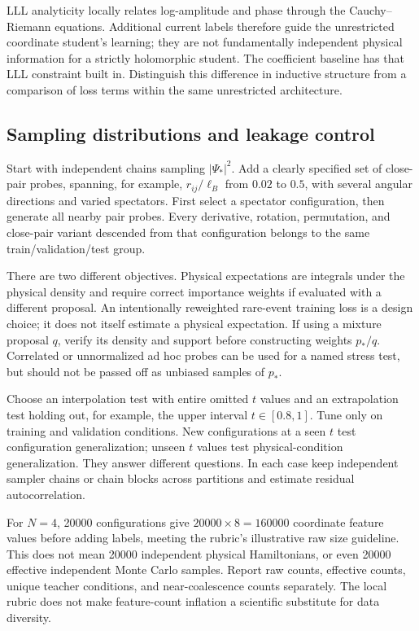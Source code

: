 \documentclass[11pt,letterpaper]{article}
\begin{document}
LLL analyticity locally relates log-amplitude and phase through the Cauchy--Riemann equations. Additional current labels therefore guide the unrestricted coordinate student's learning; they are not fundamentally independent physical information for a strictly holomorphic student. The coefficient baseline has that LLL constraint built in. Distinguish this difference in inductive structure from a comparison of loss terms within the same unrestricted architecture.

\subsection{Sampling distributions and leakage control}

Start with independent chains sampling $|\Psi_*|^2$. Add a clearly specified set of close-pair probes, spanning, for example, $r_{ij}/\ell_B$ from $0.02$ to $0.5$, with several angular directions and varied spectators. First select a spectator configuration, then generate all nearby pair probes. Every derivative, rotation, permutation, and close-pair variant descended from that configuration belongs to the same train/validation/test group.

There are two different objectives. Physical expectations are integrals under the physical density and require correct importance weights if evaluated with a different proposal. An intentionally reweighted rare-event training loss is a design choice; it does not itself estimate a physical expectation. If using a mixture proposal $q$, verify its density and support before constructing weights $p_*/q$. Correlated or unnormalized ad hoc probes can be used for a named stress test, but should not be passed off as unbiased samples of $p_*$.

Choose an interpolation test with entire omitted $t$ values and an extrapolation test holding out, for example, the upper interval $t\in[0.8,1]$. Tune only on training and validation conditions. New configurations at a seen $t$ test configuration generalization; unseen $t$ values test physical-condition generalization. They answer different questions. In each case keep independent sampler chains or chain blocks across partitions and estimate residual autocorrelation.

For $N=4$, 20000 configurations give $20000\times8=160000$ coordinate feature values before adding labels, meeting the rubric's illustrative raw size guideline. This does not mean 20000 independent physical Hamiltonians, or even 20000 effective independent Monte Carlo samples. Report raw counts, effective counts, unique teacher conditions, and near-coalescence counts separately. The local rubric does not make feature-count inflation a scientific substitute for data diversity.
\end{document}
